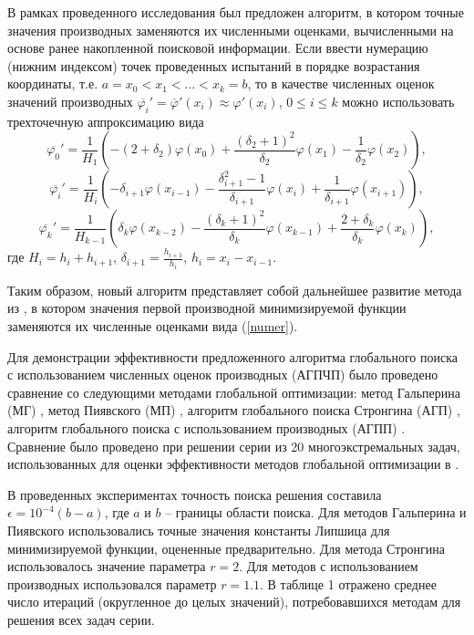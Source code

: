 \documentclass[11pt, oneside, a4paper]{article}
\begin{document}
В рамках проведенного исследования был предложен алгоритм, в котором точные значения производных заменяются их численными оценками, вычисленными на основе ранее накопленной поисковой информации. 
Если ввести нумерацию (нижним индексом) точек проведенных испытаний в порядке возрастания координаты, т.е. $a=x_0<x_1<...<x_k=b$, то в качестве численных оценок значений производных $\overline{\varphi_i}' = \overline{\varphi}'(x_i) \approx \varphi'(x_i)$, $0\leq i\leq k$ можно использовать трехточечную аппроксимацию вида
\[
\overline{\varphi_0}' = \frac{1}{H_1}\left(-(2+\delta_{2})\varphi(x_{0}) + \frac{(\delta_{2}+1)^2}{\delta_{2}}\varphi(x_1) - \frac{1}{\delta_{2}}\varphi(x_{2}) \right),
\]
\begin{equation}\label{numer}
\overline{\varphi_i}' = \frac{1}{H_i}\left(-\delta_{i+1}\varphi(x_{i-1}) - \frac{\delta_{i+1}^2-1}{\delta_{i+1}}\varphi(x_i) + \frac{1}{\delta_{i+1}}\varphi(x_{i+1}) \right),
\end{equation}
\[
\overline{\varphi_k}' = \frac{1}{H_{k-1}}\left(\delta_{k}\varphi(x_{k-2}) - \frac{(\delta_{k}+1)^2}{\delta_{k}}\varphi(x_{k-1}) + \frac{2+\delta_k}{\delta_{k}}\varphi(x_k) \right),
\]
где $H_i=h_i+h_{i+1}$, $\delta_{i+1}=\frac{h_{i+1}}{h_i}$, $h_i=x_i-x_{i-1}$.

Таким образом, новый алгоритм представляет собой дальнейшее развитие метода из \cite{Gergel96}, в котором значения первой производной минимизируемой функции заменяются их численные оценками вида (\ref{numer}).

Для демонстрации эффективности предложенного алгоритма глобального поиска с использованием численных оценок производных (АГПЧП)  было проведено сравнение со следующими методами глобальной оптимизации: метод Гальперина (МГ) \cite{Galperin}, метод Пиявского (МП) \cite{Pijavski72}, алгоритм глобального поиска Стронгина (АГП) \cite{Strongin2013}, алгоритм глобального поиска с использованием производных (АГПП) \cite{Gergel96}. Сравнение было проведено при решении серии из 20 многоэкстремальных задач, использованных для оценки эффективности методов глобальной оптимизации в \cite{Gergel96}.

В проведенных экспериментах точность поиска решения составила $\epsilon=10^{-4}(b-a)$, где $a$ и $b$ -- границы области поиска. Для методов Гальперина и Пиявского использовались точные значения константы Липшица для минимизируемой функции, оцененные предварительно. Для метода Стронгина использовалось значение параметра $r=2$. Для методов с использованием производных использовался параметр $r=1.1$. В таблице 1 отражено среднее число итераций (округленное до целых значений), потребовавшихся методам для решения всех задач серии. 
\end{document}
